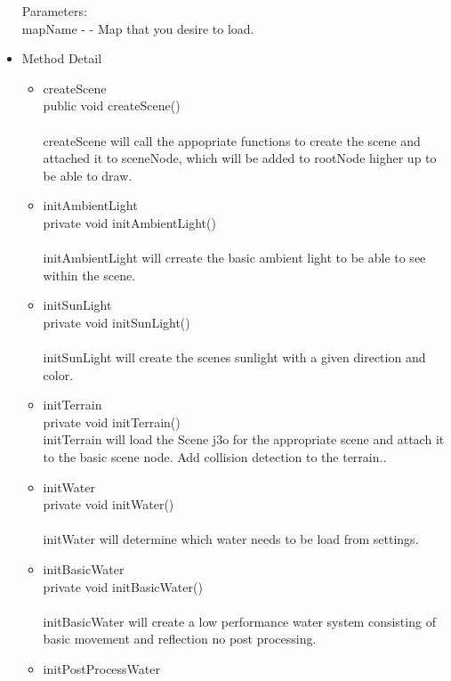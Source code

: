 \documentclass[letterpaper]{article}
\begin{document}
\begin{itemize}
								Parameters: \\
								mapName - - Map that you desire to load.
						\item	Method Detail
								\begin{itemize}
									\item	createScene \\
											public void createScene() \\ \\
											createScene will call the appopriate functions to create the scene and attached it to sceneNode, which will be added to rootNode higher up to be able to draw. \\
									\item	initAmbientLight \\
											private void initAmbientLight() \\ \\
											initAmbientLight will crreate the basic ambient light to be able to see within the scene. \\
									\item	initSunLight \\
											private void initSunLight() \\ \\
											initSunLight will create the scenes sunlight with a given direction and color.
									\item	initTerrain \\
											private void initTerrain() \\
											initTerrain will load the Scene j3o for the appropriate scene and attach it to the basic scene node. Add collision detection to the terrain.. \\
									\item	initWater \\
											private void initWater() \\ \\
											initWater will determine which water needs to be load from settings.
									\item	initBasicWater \\
											private void initBasicWater() \\ \\
											initBasicWater will create a low performance water system consisting of basic movement and reflection no post processing. \\
									\item	initPostProcessWater \\

\end{itemize}
\end{itemize}
\end{document}
